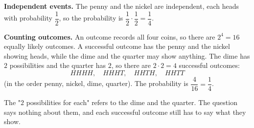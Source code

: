 \textbf{Independent events.} The penny and the nickel are independent, each heads with probability $\dfrac{1}{2}$, so the probability is $\dfrac{1}{2}\cdot\dfrac{1}{2}=\boxed{\dfrac{1}{4}}$.

\textbf{Counting outcomes.} An outcome records all four coins, so there are $2^4=16$ equally likely outcomes. A successful outcome has the penny and the nickel showing heads, while the dime and the quarter may show anything. The dime has $2$ possibilities and the quarter has $2$, so there are $2\cdot2=4$ successful outcomes:
\[
HHHH,\quad HHHT,\quad HHTH,\quad HHTT
\]
(in the order penny, nickel, dime, quarter). The probability is $\dfrac{4}{16}=\dfrac{1}{4}$.

The "$2$ possibilities for each" refers to the dime and the quarter. The question says nothing about them, and each successful outcome still has to say what they show.
